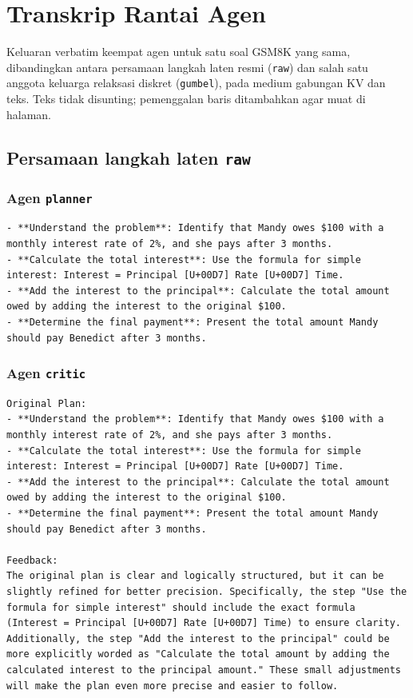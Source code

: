 \chapter{Transkrip Rantai Agen}
\label{lamp:transkrip}

Keluaran verbatim keempat agen untuk satu soal GSM8K yang sama, dibandingkan antara persamaan langkah laten resmi (\texttt{raw}) dan salah satu anggota keluarga relaksasi diskret (\texttt{gumbel}), pada medium gabungan KV dan teks. Teks tidak disunting; pemenggalan baris ditambahkan agar muat di halaman.

\section*{Persamaan langkah laten \texttt{raw}}
\subsection*{Agen \texttt{planner}}
\begin{lstlisting}[basicstyle=\ttfamily\scriptsize,breaklines=true,frame=single]
- **Understand the problem**: Identify that Mandy owes $100 with a monthly interest rate of 2%, and she pays after 3 months.  
- **Calculate the total interest**: Use the formula for simple interest: Interest = Principal [U+00D7] Rate [U+00D7] Time.  
- **Add the interest to the principal**: Calculate the total amount owed by adding the interest to the original $100.  
- **Determine the final payment**: Present the total amount Mandy should pay Benedict after 3 months.
\end{lstlisting}

\subsection*{Agen \texttt{critic}}
\begin{lstlisting}[basicstyle=\ttfamily\scriptsize,breaklines=true,frame=single]
Original Plan:  
- **Understand the problem**: Identify that Mandy owes $100 with a monthly interest rate of 2%, and she pays after 3 months.  
- **Calculate the total interest**: Use the formula for simple interest: Interest = Principal [U+00D7] Rate [U+00D7] Time.  
- **Add the interest to the principal**: Calculate the total amount owed by adding the interest to the original $100.  
- **Determine the final payment**: Present the total amount Mandy should pay Benedict after 3 months.

Feedback:  
The original plan is clear and logically structured, but it can be slightly refined for better precision. Specifically, the step "Use the formula for simple interest" should include the exact formula (Interest = Principal [U+00D7] Rate [U+00D7] Time) to ensure clarity. Additionally, the step "Add the interest to the principal" could be more explicitly worded as "Calculate the total amount by adding the calculated interest to the principal amount." These small adjustments will make the plan even more precise and easier to follow.
\end{lstlisting}

